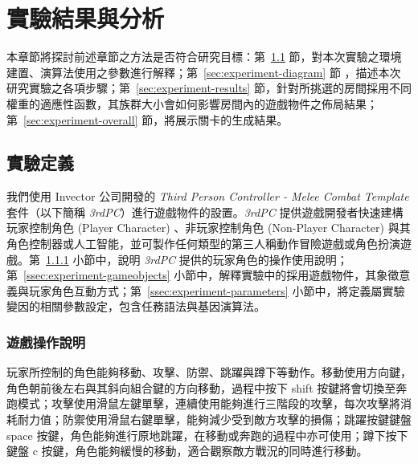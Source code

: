 \newcommand{\garesultstable}[5]{{
\begin{table}[H]
  \centering
  \caption{實驗 #2 - 共 #3 回合的最佳個體之標準化加權適應值}
  \label{tbl:result-of-experiment-#1}
  \bigskip
  \vspace{-5mm}
  \garesultssubtable{#4}
  \garesultssubtable{#5}
\end{table}
}}

\chapter{實驗結果與分析}
\label{cha:experiment}

本章節將探討前述章節之方法是否符合研究目標：第~\ref{sec:experiment-definition} 節，對本次實驗之環境建置、演算法使用之參數進行解釋；第~\ref{sec:experiment-diagram} 節
，描述本次研究實驗之各項步驟；第~\ref{sec:experiment-results} 節，針對所挑選的房間採用不同權重的適應性函數，其族群大小會如何影響房間內的遊戲物件之佈局結果；第~\ref{sec:experiment-overall} 節，將展示關卡的生成結果。

\section{實驗定義}
\label{sec:experiment-definition}

我們使用 Invector 公司開發的 \textit{Third Person Controller - Melee Combat Template} 套件（以下簡稱 \textit{3rdPC}）進行遊戲物件的設置。\textit{3rdPC} 提供遊戲開發者快速建構玩家控制角色 (Player Character) 、非玩家控制角色 (Non-Player Character) 與其角色控制器或人工智能，並可製作任何類型的第三人稱動作冒險遊戲或角色扮演遊戲。第~\ref{ssec:experiment-gameplaymanual} 小節中，說明 \textit{3rdPC} 提供的玩家角色的操作使用說明；第~\ref{ssec:experiment-gameobjects} 小節中，解釋實驗中的採用遊戲物件，其象徵意義與玩家角色互動方式；第~\ref{ssec:experiment-parameters} 小節中，將定義屬實驗變因的相關參數設定，包含任務語法與基因演算法。

\subsection{遊戲操作說明}
\label{ssec:experiment-gameplaymanual}

玩家所控制的角色能夠移動、攻擊、防禦、跳躍與蹲下等動作。移動使用方向鍵，角色朝前後左右與其斜向組合鍵的方向移動，過程中按下 shift 按鍵將會切換至奔跑模式；攻擊使用滑鼠左鍵單擊，連續使用能夠進行三階段的攻擊，每次攻擊將消耗耐力值；防禦使用滑鼠右鍵單擊，能夠減少受到敵方攻擊的損傷；跳躍按鍵鍵盤 space 按鍵，角色能夠進行原地跳躍，在移動或奔跑的過程中亦可使用；蹲下按下鍵盤 c 按鍵，角色能夠緩慢的移動，適合觀察敵方戰況的同時進行移動。

